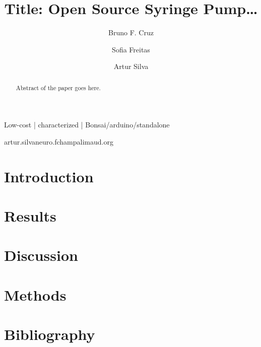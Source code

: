 
\title{Title: Open Source Syringe Pump…}

\author[1,2]{Bruno F. Cruz }
\author[2]{Sofia Freitas }
\author[1,\Letter]{Artur Silva }
\date{}

\maketitle

\begin{abstract}
Abstract of the paper goes here.
\lipsum[1]
\end{abstract}

\begin{keywords}
Low-cost | characterized | Bonsai/arduino/standalone
\end{keywords}

\begin{corrauthor}
artur.silva\at neuro.fchampalimaud.org
\end{corrauthor}

\section*{Introduction}\label{s:introduction}


\section*{Results}\label{s:results}


\section*{Discussion}\label{s:discussion}

\lipsum[100-104]

\section*{Methods}\label{s:methods}


\section*{Bibliography}



